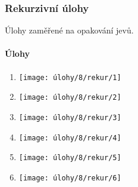 \newpage
\subsubsection{Rekurzivní úlohy}
Úlohy zaměřené na opakování jevů.

\paragraph{Úlohy}
\begin{enumerate}
	\item
	\begin{minipage}[t]{\linewidth}
		\begin{quote}
			
		\end{quote}
		\centering
		\texttt{[image: úlohy/8/rekur/1]}
	\end{minipage}

	\item
	\begin{minipage}[t]{\linewidth}
		\begin{quote}
			
		\end{quote}
		\centering
		\texttt{[image: úlohy/8/rekur/2]}
	\end{minipage}
	
	\item
	\begin{minipage}[t]{\linewidth}
		\begin{quote}
			
		\end{quote}
		\centering
		\texttt{[image: úlohy/8/rekur/3]}
	\end{minipage}
	
	\item
	\begin{minipage}[t]{\linewidth}
		\begin{quote}
			
		\end{quote}
		\centering
		\texttt{[image: úlohy/8/rekur/4]}
	\end{minipage}
	
	\item
	\begin{minipage}[t]{\linewidth}
		\begin{quote}
			
		\end{quote}
		\centering
		\texttt{[image: úlohy/8/rekur/5]}
	\end{minipage}
	
	\item
	\begin{minipage}[t]{\linewidth}
		\begin{quote}
			
		\end{quote}
		\centering
		\texttt{[image: úlohy/8/rekur/6]}
	\end{minipage}
	
	
\end{enumerate}

